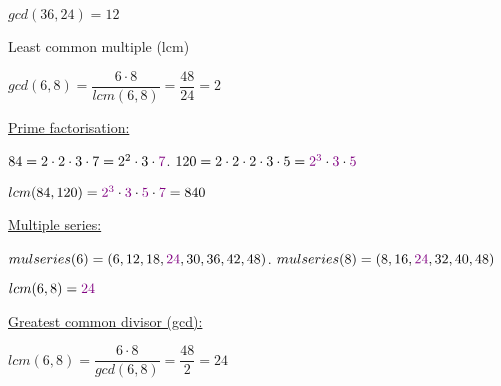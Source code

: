 \documentclass[landscape, a4paper]{article}
\begin{document}
\begin{minipage}[t]{0.2\linewidth}
\begin{betterlist}
\begin{betterlist}
\begin{betterlist}
				\item $gcd(36,24) = 12$
			\end{betterlist}
			\item \alert{Least common multiple (lcm)}
			\begin{betterlist}
				\item $gcd(6, 8) = \dfrac{6\cdot 8}{lcm(6, 8)} = \dfrac{48}{24} = 2$
			\end{betterlist}
			\begin{betterlist}
				\item \underline{Prime factorisation:}
				\begin{betterlist}
					\item $84 = 2\cdot 2\cdot 3\cdot 7 = 2^2\cdot 3\cdot \textcolor{PrimaryColor}{7}$. $120 = 2\cdot 2\cdot 2\cdot 3\cdot 5= \textcolor{PrimaryColor}{2^3}\cdot \textcolor{PrimaryColor}{3}\cdot \textcolor{PrimaryColor}{5}$
					\item $lcm(84, 120) = \textcolor{PrimaryColor}{2^3}\cdot \textcolor{PrimaryColor}{3}\cdot\textcolor{PrimaryColor}{5}\cdot \textcolor{PrimaryColor}{7} = 840$
				\end{betterlist}
			\end{betterlist}
			\begin{betterlist}
				\item \underline{Multiple series:}
				\begin{betterlist}
					\item $mulseries(6) = (6, 12, 18, \textcolor{PrimaryColor}{24}, 30, 36, 42, 48)$. $mulseries(8) = (8, 16, \textcolor{PrimaryColor}{24}, 32, 40, 48)$
					\item $lcm(6, 8) = \textcolor{PrimaryColor}{24}$
				\end{betterlist}
			\end{betterlist}
			\begin{betterlist}
				\item \underline{Greatest common divisor (gcd):}
				\begin{betterlist}
					\item $lcm(6, 8) = \dfrac{6\cdot 8}{gcd(6, 8)} = \dfrac{48}{2} = 24$
				\end{betterlist}
			\end{betterlist}
		\end{betterlist}
	\end{betterlist}
\end{minipage}
\end{document}
